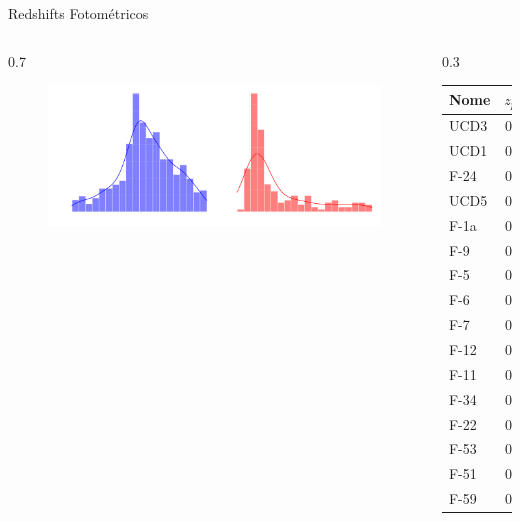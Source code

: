 \begin{frame}[c]{Redshifts Fotométricos}
    \begin{columns}[c]
        \begin{column}{0.7\linewidth}
            \begin{figure}
                \includegraphics[width=\linewidth]{images/z_zml_distribution.png}
            \end{figure}
        \end{column}
        \begin{column}{0.3\linewidth}
            \begin{table}[!ht]
                \centering
                \scriptsize
                \begin{tabular}{lccc}
                    \toprule
                    Nome & \textit{$z_{phot}$} & \textit{zml} & \textit{$z_{spec}$}\\
                    \midrule
                    UCD3 & 0.07 & 0.03 & 0.0053\\
                    UCD1 & 0.09 & 0.08 & 0.0052\\
                    F-24 & 0.08 & 0.04 & 0.0062\\
                    UCD5 & 0.03 & 0.04 & 0.0045\\
                    F-1a & 0.21 & -- & 0.0042\\
                    F-9 & 0.09 & 0.07 & 0.0058\\
                    F-5 & 0.06 & -- & 0.0057\\
                    F-6 & 0.10 & -- & 0.0037\\
                    F-7 & 0.19 & 0.16 & 0.0050\\
                    F-12 & 0.07 & -- & 0.0055\\
                    F-11 & 0.10 & -- & 0.0059\\
                    F-34 & 0.07 & -- & 0.0054\\ 
                    F-22 & 0.09 & 0.06 & 0.0034\\
                    F-53 & 0.31 & -- & 0.0020\\
                    F-51 & 0.10 & -- & 0.0041\\
                    F-59 & 0.06 & -- & 0.0060\\
                    \midrule
                \end{tabular}
            \end{table}
        \end{column}
    \end{columns}
\end{frame}

